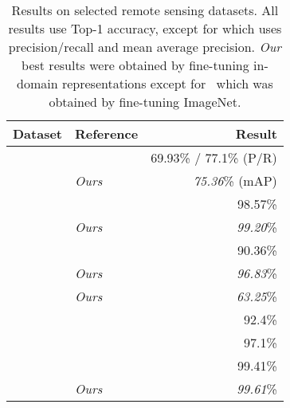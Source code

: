\begin{table}[tb]
    \centering
    \caption{Results on selected remote sensing datasets. All results use Top-1 accuracy, except for \bigearthnet{} which uses precision/recall and mean average precision.
    \textit{Our} best results were obtained by fine-tuning in-domain representations except for \ben\ which was obtained by fine-tuning ImageNet.}
    \label{tab:benchmarks}
    \begin{tabular}{llr}
    \toprule
    Dataset & Reference & Result \\
    
    \midrule
    \multirow{2}{*}{\bigearthnet{}} & \cite{sumbul2019:bigearthnet} & 69.93\% / 77.1\% (P/R) \\
    & \textit{Ours} & \textit{75.36}\% (mAP) \\
    
    \midrule
    \multirow{2}{*}{\eurosat{}} & \cite{helber2019:eurosat} & 98.57\%\\
    & \textit{Ours} & \textit{99.20}\% \\

    \midrule
    \multirow{2}{*}{\resisc{}} & \cite{cheng2017:resisc45} & 90.36\% \\
    & \textit{Ours} & \textit{96.83}\% \\
    
    \midrule
    \multirow{1}{*}{\sosat{}} & \textit{Ours} & \textit{63.25}\% \\
    
    \midrule
    \multirow{4}{*}{\ucmerced{}} &
    \cite{marmanis2016} & 92.4\%  \\
    & \cite{castelluccio2015} & 97.1\%  \\
    & \cite{nogueira2016:cnn} & 99.41\% \\
    & \textit{Ours} & \textit{99.61}\% \\
    
    \bottomrule
    \end{tabular}
\end{table}

 

